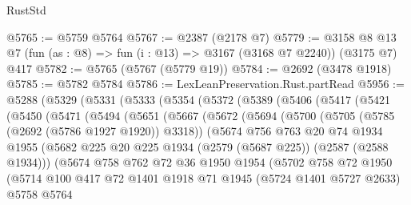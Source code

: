 \begin{lexlean}{RustStd}
\begin{coremodule}
{\begin{coremodule}
{{{{{{{{{{@5765 := @5759 @5764
@5767 := @2387 (@2178 @7)
@5779 := @3158 @8 @13 @7 (fun (as : @8) => fun (i : @13) => @3167 (@3168 @7 @2240)) (@3175 @7) @417
@5782 := @5765 (@5767 (@5779 @19))
@5784 := @2692 (@3478 @1918)
@5785 := @5782 @5784
@5786 := LexLeanPreservation.Rust.partRead
@5956 := @5288
    (@5329
      (@5331
        (@5333
          (@5354
            (@5372
              (@5389
                (@5406
                  (@5417
                    (@5421
                      (@5450
                        (@5471
                          (@5494
                            (@5651
                              (@5667
                                (@5672
                                  (@5694
                                    (@5700
                                      (@5705 (@5785 (@2692 (@5786 @1927 @1920)) @3318))
                                      (@5674
                                        @756
                                        @763
                                        @20
                                        @74
                                        @1934
                                        @1955
                                        (@5682
                                          @225
                                          @20
                                          @225
                                          @1934
                                          (@2579 (@5687 @225))
                                          (@2587 (@2588 @1934)))
                                        (@5674
                                          @758
                                          @762
                                          @72
                                          @36
                                          @1950
                                          @1954
                                          (@5702
                                            @758
                                            @72
                                            @1950
                                            (@5714
                                              @100
                                              @417
                                              @72
                                              @1401
                                              @1918
                                              @71
                                              @1945
                                              (@5724 @1401 @5727 @2633)
                                              @5758
                                              @5764
}}}}}}}}}}
\end{coremodule}}
\end{coremodule}
\end{lexlean}
